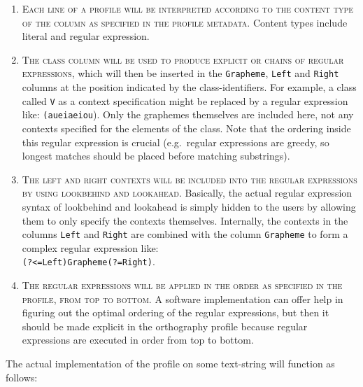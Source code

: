 \begin{enumerate}
	\def\labelenumi{B\arabic{enumi}.} 
	\item \textsc{Each line of a profile will be interpreted according to the content type of the column as specified in the profile metadata}. Content types include literal and regular expression.
	\item \textsc{The \textsc{class} column will be used to produce explicit
       \textsc{or} chains of regular expressions}, which will then be inserted
       in the \texttt{Grapheme}, \texttt{Left} and \texttt{Right} columns at
       the position indicated by the class-identifiers. For example, a class
       called \texttt{V} as a context specification might be replaced by a regular
       expression like:
       \texttt{(au\textbar{}ei\textbar{}a\textbar{}e\textbar{}i\textbar{}o\textbar{}u}).
       Only the graphemes themselves are included here, not any contexts
       specified for the elements of the class. Note that the 
       ordering inside this regular expression is crucial (e.g.\ regular expressions are greedy, so
	   longest matches should be placed before matching substrings).
	\item \textsc{The \textsc{left} and \textsc{right} contexts will be included
       into the regular expressions by using lookbehind and lookahead}.
       Basically, the actual regular expression syntax of lookbehind and
       lookahead is simply hidden to the users by allowing them to only specify
       the contexts themselves. Internally, the contexts in the columns
       \texttt{Left} and \texttt{Right} are combined with the column
       \texttt{Grapheme} to form a complex regular expression like:\\ 
       \texttt{(?\textless{}=Left)Grapheme(?=Right)}. 
	\item \textsc{The regular expressions will be applied in the order as specified
       in the profile, from top to bottom.} A software implementation can offer
       help in figuring out the optimal ordering of the regular expressions, but
       then it should be made explicit in the orthography profile because regular 
	   expressions are executed in order from top to bottom.
\end{enumerate}

\noindent The actual implementation of the profile on some text-string will function as
follows:

